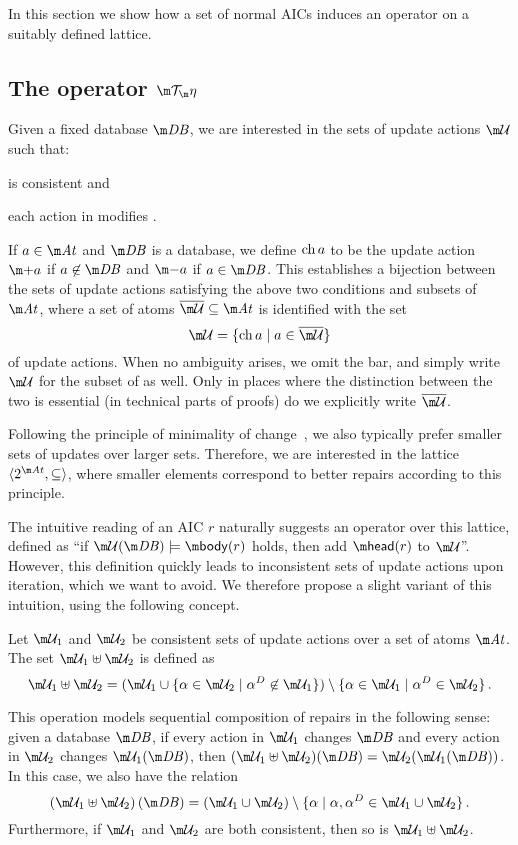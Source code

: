 In this section we show how a set of normal AICs induces an operator on a suitably defined lattice.

\subsection{The operator $\Op$}

Given a fixed database $\db$, we are interested in the sets of update actions $\UU$ such that:
\begin{inparaenum}
\item \UU is consistent and 
\item each action in \UU modifies \db.
\end{inparaenum}
If $a\in \atoms$ and $\db$ is a database, we define $\operatorname{ch} a$ to be the update action $\add a$ if $a\not\in \db$ and $\remove a$ if $a \in \db$.
This establishes a bijection between the sets of update actions satisfying the above two conditions and subsets of $\atoms$, where a set of atoms $\overline\UU\subseteq\atoms$ is identified with the set 
\[\UU = \{\change a\mid a \in \overline \UU \}\]
of update actions.
When no ambiguity arises, we omit the bar, and simply write $\UU$ for the subset of \atoms as well.
Only in places where the distinction between the two is essential (in technical parts of proofs) do we explicitly write $\overline\UU$.

Following the principle of minimality of change~\cite{Winslett90,ai/EiterG92}, we also typically prefer smaller sets of updates over larger sets.
Therefore, we are interested in the lattice $\langle 2^{\atoms},\subseteq\rangle$, where smaller elements correspond to better repairs according to this principle.

The intuitive reading of an AIC $r$ naturally suggests an operator over this lattice, defined as ``if $\UU(\db)\models\body(r)$ holds, then add $\head(r)$ to $\UU$''.
However, this definition quickly leads to inconsistent sets of update actions upon iteration, which we want to avoid.
We therefore propose a slight variant of this intuition, using the following concept.

\begin{definition}
  Let $\UU_1$ and $\UU_2$ be consistent sets of update actions over a set of atoms $\atoms$.
  The set $\UU_1\uplus\UU_2$ is defined as
  \[\UU_1\uplus\UU_2 = (\UU_1\cup\{\alpha\in\UU_2\mid\alpha^D\not\in\UU_1\})\setminus\{\alpha\in\UU_1\mid\alpha^D\in\UU_2\}\,.\]
\end{definition}
This operation models sequential composition of repairs in the following sense: given a database $\db$, if every action in $\UU_1$ changes $\db$ and every action in $\UU_2$ changes $\UU_1(\db)$, then $(\UU_1\uplus\UU_2)(\db)=\UU_2(\UU_1(\db))$.
In this case, we also have the relation
\[\left(\UU_1\uplus \UU_2\right)(\db) = \left(\UU_1\cup \UU_2\right) \setminus \{\alpha \mid \alpha,\alpha^D\in \UU_1\cup\UU_2\}\,.\]
Furthermore, if $\UU_1$ and $\UU_2$ are both consistent, then so is $\UU_1\uplus\UU_2$.

